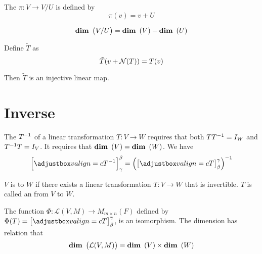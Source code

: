 \begin{definition}
    The  $\pi : V \rightarrow V/U$ is defined by 
    \begin{equation}
        \pi(v) = v + U
    \end{equation}
\end{definition}

\begin{theorem}
    \begin{equation}
        \displaystyle \mathop{\bf dim\/}~\left( V/U \right) = \displaystyle \mathop{\bf dim\/}~\left( V \right) - \displaystyle \mathop{\bf dim\/}~\left( U \right)
    \end{equation}    
\end{theorem}

\begin{theorem}
    Define $\tilde{T}$ as 
    \begin{equation}
        \tilde{T}(v + \mathcal{N}(T)) = T(v)
    \end{equation}
    
    Then $\tilde{T}$ is an injective linear map.
\end{theorem}

%
%
%
%


\section{Inverse}
The  ${T}^{-1}$ of a linear transformation $T:V \rightarrow W$ requires that both $T {T}^{-1} = I_W$ and ${T}^{-1} T = I_V$. It requires that $\displaystyle \mathop{\bf dim\/}~\left( V \right) = \displaystyle \mathop{\bf dim\/}~\left( W \right)$. We have
\begin{equation}
    \coordinate{\inverse{T}}_{\gamma}^{\beta} = \inverse{\left( \coordinate{T}_{\beta}^{\gamma} \right)}
\end{equation}


\begin{definition}
	$V$ is  to $W$ if there exists a linear transformation $T:V\rightarrow W$ that is invertible. $T$ is called an   from $V$ to $W$.
\end{definition}


\begin{theorem}
	The function $\Phi: \mathcal{L}(V,M) \rightarrow M_{m \times n}(F)$ defined by $\Phi (T) = \coordinate{T}_\beta^\gamma$, is an isomorphism. The dimension has relation that 
	\begin{equation}
		\displaystyle \mathop{\bf dim\/}~\left( \mathcal{L}(V,M) \right) = \displaystyle \mathop{\bf dim\/}~\left( V \right) \times \displaystyle \mathop{\bf dim\/}~\left( W \right)
	\end{equation}
\end{theorem}


